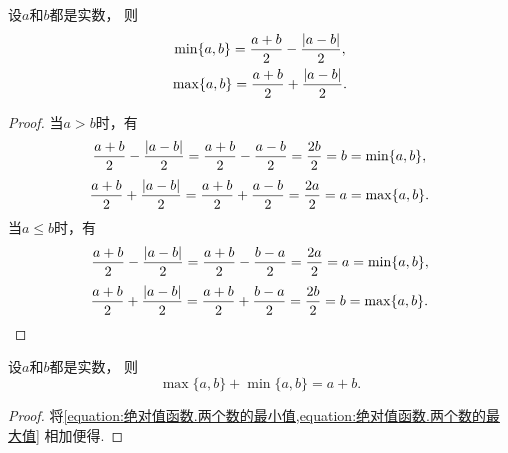 \begin{proposition}
设\(a\)和\(b\)都是实数，
则\begin{gather}
	\min\{a,b\}
	= \frac{a+b}{2}
	- \frac{\abs{a-b}}{2},
		\label{equation:绝对值函数.两个数的最小值} \\
	\max\{a,b\}
	= \frac{a+b}{2}
	+ \frac{\abs{a-b}}{2}.
		\label{equation:绝对值函数.两个数的最大值}
\end{gather}
\begin{proof}
当\(a>b\)时，有\begin{equation*}
	\frac{a+b}{2} - \frac{\abs{a-b}}{2}
	= \frac{a+b}{2} - \frac{a-b}{2}
	= \frac{2b}{2} = b
	= \min\{a,b\},
\end{equation*}\begin{equation*}
	\frac{a+b}{2} + \frac{\abs{a-b}}{2}
	= \frac{a+b}{2} + \frac{a-b}{2}
	= \frac{2a}{2} = a
	= \max\{a,b\}.
\end{equation*}
当\(a \leq b\)时，有\begin{equation*}
	\frac{a+b}{2} - \frac{\abs{a-b}}{2}
	= \frac{a+b}{2} - \frac{b-a}{2}
	= \frac{2a}{2} = a
	= \min\{a,b\},
\end{equation*}\begin{equation*}
	\frac{a+b}{2} + \frac{\abs{a-b}}{2}
	= \frac{a+b}{2} + \frac{b-a}{2}
	= \frac{2b}{2} = b
	= \max\{a,b\}.
	\qedhere
\end{equation*}
\end{proof}
\end{proposition}

\begin{corollary}
设\(a\)和\(b\)都是实数，
则\begin{equation}
	\max\{a,b\} + \min\{a,b\} = a + b.
		\label{equation:绝对值函数.两个数的最小值最大值的关联}
\end{equation}
\begin{proof}
将\cref{equation:绝对值函数.两个数的最小值,equation:绝对值函数.两个数的最大值}
相加便得.
\end{proof}
\end{corollary}
